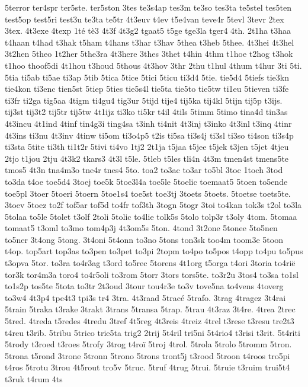 {5terror
ter4spr
ter5ste.
ter5ston
3tes
te3s4ap
tes3m
te3so
tes3ta
te5stel
tes5ten
test5op
test5ri
test3u
te3ta
te5tr
4t3euv
t4ev
t5e4van
teve4r
5tevl
3tevr
2tex
3tex.
4t3exe
4texp
1té
tè3
4t3f
4t3g2
tgaat5
t5ge
tge3la
tger4
4th.
2t1ha
t3haa
t4haan
t4had
t3hak
t5ham
t4hans
t3har
t3hav
5thea
t3heb
5thee.
4t3hei
4t3hel
3t2hen
5theo
1t2her
5the3ra
4t3here
3thes
3thet
t4hin
4thm
t1hoe
t2hog
t3hok
t1hoo
thoof5di
4t1hou
t3houd
5thous
4t3hov
3thr
2thu
t1hul
4thum
t4hur
3ti
5ti.
5tia
ti5ab
ti5ae
ti3ap
5tib
5tica
5tice
5tici
5ticu
ti3d4
5tie.
tie5d4
5tiefs
tie3kn
tie4kon
ti3enc
tien5st
5tiep
5ties
tie5s4l
tie5ta
tie5to
tie5tw
ti1eu
5tieven
ti3fe
ti3fr
ti2ga
tig5aa
4tigm
ti4gu4
tig3ur
5tijd
tije4
tij5ka
tij4kl
5tijn
tij5p
t3ijs.
tij3st
tij3t2
tij5tr
tij5tw
4t1ijz
ti3ko
ti5kr
t4il
4tils
5timm
5timo
tina4d
tin3as
4t3incu
4t1ind
4tinf
tin4g3i
ting4sa
t3inh
ti4nit
4t3inj
t3inko
4t3inl
t3inq
4tinr
4t3ins
ti3nu
4t3inv
4tinw
ti5om
ti3o4p5
t2is
ti5sa
ti3s4j
ti3sl
ti3so
ti4son
ti3s4p
ti3sta
5tite
ti3th
ti1t2r
5tivi
ti4vo
1tj2
2t1ja
t5jaa
t5jee
t5jek
t3jen
t5jet
4tjeu
2tjo
t1jou
2tju
4t3k2
tkars3
4t3l
t5le.
5tleb
t5les
tli4n
4t3m
tmen4st
tmens5te
tmos5
4t3n
tna4m3o
tne4r
tnes4
5to.
toa2
to3ac
to3ar
to5bl
3toc
1toch
3tod
to3da
t4oe
toe5d4
3toej
toe5k
5toe3l4a
toe5le
5toelic
toemaat5
5toen
to5ende
toe5pl
3toer
5toeri
5toern
5toe1s4
toe5st
toe3tj
3toets
5toets.
5toetse
toets5te.
3toev
5toez
to2f
tof5ar
tof5d
to4fr
tof3th
3togn
5togr
3toi
to4kan
tok3s
t2ol
to3la
5tolaa
to5le
5tolet
t3olf
2toli
5tolic
to4lie
tolk5s
5tolo
tolp3r
t3oly
4tom.
5tomaa
tomaat5
t3oml
to3mo
tom4p3j
4t3om5s
5ton.
4tond
3t2one
5tonee
5to5nen
to5ner
3t4ong
5tong.
3t4oni
5t4onn
to3no
5tons
ton3sk
too4m
toom3e
5toon
t4op.
top5art
top3as
to3pen
to3pet
to3pi
2topm
to4po
to5pos
t4opp
to4pu
to5pus
t3opva
5tor.
to3ra
to4r3ag
t3ord
to5rec
5torens
4t1org
t5orga
t4ori
3toria
to4rië
tor3k
tor4m3a
toro4
to4r5oli
to3rom
5torr
3tors
tors5te.
to3r2u
3tos4
to3sa
to1sl
to1s2p
tos5te
5tota
to3tr
2t3oud
3tour
tou4r3e
to3v
tove5na
to4vens
4toverg
to3w4
4t3p4
tpe4t3
tpi3s
tr4
3tra.
4t3raad
5tracé
5trafo.
3trag
4tragez
3t4rai
5train
5traka
t3rake
3trakt
3trans
5transa
5trap.
5trau
4t3raz
3t4re.
4trea
2trec
5tred.
4treda
t5redes
4tredu
3tref
4t5reg
4t3reis
4treiz
4trel
t3rese
t3resu
tre2t3
t4reu
t3rib.
5tribu
5trico
trie5ta
trig2
2trij
5t4ril
tri5ni
5t4rio4
t3risi
t3rit.
5t4riti
5trody
t3roed
t3roes
5trofy
3trog
t4roï
5troj
4trol.
5trola
5trolo
5tromm
5tron.
5trona
t5rond
3trone
5tronn
5trono
5trons
tront5j
t3rood
5troon
t4roos
tro5pi
t4ros
5trotu
3trou
4t5rout
tro5v
5truc.
5truf
4trug
5trui.
5truie
t3ruim
trui5t4
t3ruk
t4rum
4ts
}
